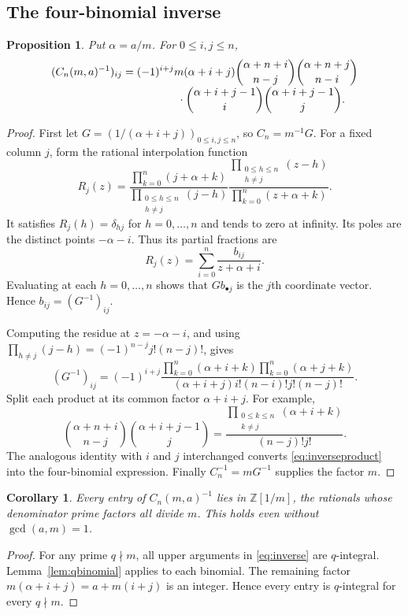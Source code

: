 \documentclass[11pt,a4paper]{article}
\numberwithin{equation}{section}
\newtheorem{proposition}[theorem]{Proposition}
\newtheorem{corollary}[theorem]{Corollary}
\theoremstyle{definition}
\theoremstyle{remark}
\newcommand{\Z}{\mathbb{Z}}
\begin{document}
\subsection{The four-binomial inverse}
\begin{proposition}\label{prop:inverse}
Put $\alpha=a/m$. For $0\leq i,j\leq n$,
\begin{align}
 (C_n(m,a)^{-1})_{ij}
 ={}&(-1)^{i+j}m(\alpha+i+j)
 \binom{\alpha+n+i}{n-j}\binom{\alpha+n+j}{n-i}\notag\\[-1mm]
 &\hspace{13mm}\cdot
 \binom{\alpha+i+j-1}{i}\binom{\alpha+i+j-1}{j}.
 \label{eq:inverse}
\end{align}
\end{proposition}
\begin{proof}
First let $G=(1/(\alpha+i+j))_{0\leq i,j\leq n}$, so $C_n=m^{-1}G$. For a fixed column $j$, form the rational interpolation function
\begin{equation}\label{eq:Rj}
 R_j(z)=
 \frac{\prod_{k=0}^n(j+\alpha+k)}{\prod_{\substack{0\leq h\leq n\\h\neq j}}(j-h)}
 \frac{\prod_{\substack{0\leq h\leq n\\h\neq j}}(z-h)}
 {\prod_{k=0}^n(z+\alpha+k)}.
\end{equation}
It satisfies $R_j(h)=\delta_{hj}$ for $h=0,\ldots,n$ and tends to zero at infinity. Its poles are the distinct points $-\alpha-i$. Thus its partial fractions are
\[
 R_j(z)=\sum_{i=0}^n\frac{b_{ij}}{z+\alpha+i}.
\]
Evaluating at each $h=0,\ldots,n$ shows that $Gb_{\bullet j}$ is the $j$th coordinate vector. Hence $b_{ij}=(G^{-1})_{ij}$.

Computing the residue at $z=-\alpha-i$, and using
$\prod_{h\ne j}(j-h)=(-1)^{n-j}j!(n-j)!$, gives
\begin{equation}\label{eq:inverseproduct}
 (G^{-1})_{ij}
 =(-1)^{i+j}
 \frac{\prod_{k=0}^n(\alpha+i+k)\prod_{k=0}^n(\alpha+j+k)}
 {(\alpha+i+j)i!(n-i)!j!(n-j)!}.
\end{equation}
Split each product at its common factor $\alpha+i+j$. For example,
\[
 \binom{\alpha+n+i}{n-j}\binom{\alpha+i+j-1}{j}
 =\frac{\prod_{\substack{0\leq k\leq n\\k\neq j}}(\alpha+i+k)}{(n-j)!j!}.
\]
The analogous identity with $i$ and $j$ interchanged converts \eqref{eq:inverseproduct} into the four-binomial expression. Finally $C_n^{-1}=mG^{-1}$ supplies the factor $m$.
\end{proof}

\begin{corollary}\label{cor:localizedinverse}
Every entry of $C_n(m,a)^{-1}$ lies in $\Z[1/m]$, the rationals whose denominator prime factors all divide $m$. This holds even without $\gcd(a,m)=1$.
\end{corollary}
\begin{proof}
For any prime $q\nmid m$, all upper arguments in \eqref{eq:inverse} are $q$-integral. Lemma~\ref{lem:qbinomial} applies to each binomial. The remaining factor $m(\alpha+i+j)=a+m(i+j)$ is an integer. Hence every entry is $q$-integral for every $q\nmid m$.
\end{proof}
\end{document}
